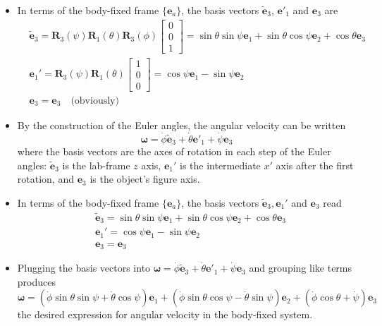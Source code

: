 \documentclass[11pt, a4paper]{article}
\newcommand{\e}{\bm{e}} %
\newcommand{\mat}[1]{\mathbf{#1}}
\begin{document}
\begin{itemize}
	\item In terms of the body-fixed frame $ \{\e_{a} \} $, the basis vectors $ \tilde{\e}_{3} $, $ \e'_{1} $ and $ \e_{3} $ are
	\begin{align*}
		&\tilde{\e}_{3} = \mat{R}_{3}(\psi)\mat{R}_{1}(\theta) \mat{R}_{3}(\phi)
		\begin{bmatrix}
			0\\
			0\\
			1
		\end{bmatrix}
		= \sin \theta \sin \psi \e_{1} + \sin \theta \cos \psi \e_{2} + \cos \theta \e_{3}\\
		&\e_{1}' = \mat{R}_{3}(\psi)\mat{R}_{1}(\theta) 		
		\begin{bmatrix}
			1\\
			0\\
			0
		\end{bmatrix}
		= \cos \psi \e_{1} - \sin \psi \e_{2}\\
		&\e_{3} = \e_{3} \quad \text{(obviously)}
	\end{align*}

	\item By the construction of the Euler angles, the angular velocity can be written
	\begin{equation*}
		\bm{\omega} = \dot{\phi} \tilde{\e}_{3} + \dot{\theta} \e'_{1} + \dot{\psi} \e_{3}
	\end{equation*}
	where the basis vectors are the axes of rotation in each step of the Euler angles: $ \tilde{\e}_{3} $ is the lab-frame $ z $ axis, $ \e_{1}' $ is the intermediate $ x' $ axis after the first rotation, and $ \e_{3} $ is the object's figure axis.
	
	\item In terms of the body-fixed frame $ \{\e_{a} \} $, the basis vectors $ \tilde{\e}_{3}, \e_{1}' $ and $ \e_{3} $  read
	\begin{align*}
		&\tilde{\e}_{3} = \sin \theta \sin \psi \e_{1} + \sin \theta \cos \psi \e_{2} + \cos \theta \e_{3}\\
		&\e_{1}' = \cos \psi \e_{1} - \sin \psi \e_{2}\\
		&\e_{3} = \e_{3}
	\end{align*}
	\vspace{-10mm} %
	\item Plugging the basis vectors into $ \bm{\omega} = \dot{\phi} \tilde{\e}_{3} + \dot{\theta} \e'_{1} + \dot{\psi} \e_{3} $ and grouping like terms produces
	\begin{equation*}
		\bm{\omega} = (\dot \phi \sin \theta \sin \psi + \dot{\theta} \cos \psi) \e_{1} + (\dot{\phi} \sin \theta \cos \psi - \dot{\theta} \sin \psi) \e_{2} + (\dot{\phi } \cos \theta + \dot{\psi} ) \e_{3}
	\end{equation*}
	the desired expression for angular velocity in the body-fixed system.	

\end{itemize}
\end{document}
